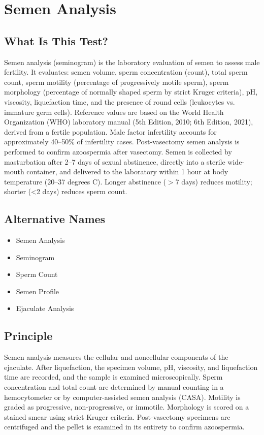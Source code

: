 \chapter{Semen Analysis}
\section*{What Is This Test?}
Semen analysis (seminogram) is the laboratory evaluation of semen to assess male fertility. It evaluates: semen volume, sperm concentration (count), total sperm count, sperm motility (percentage of progressively motile sperm), sperm morphology (percentage of normally shaped sperm by strict Kruger criteria), pH, viscosity, liquefaction time, and the presence of round cells (leukocytes vs. immature germ cells). Reference values are based on the World Health Organization (WHO) laboratory manual (5th Edition, 2010; 6th Edition, 2021), derived from a fertile population. Male factor infertility accounts for approximately 40--50\% of infertility cases. Post-vasectomy semen analysis is performed to confirm azoospermia after vasectomy. Semen is collected by masturbation after 2--7 days of sexual abstinence, directly into a sterile wide-mouth container, and delivered to the laboratory within 1 hour at body temperature (20--37 degrees C). Longer abstinence ($>$7 days) reduces motility; shorter (<2 days) reduces sperm count.
\section*{Alternative Names}
\begin{itemize}
  \item Semen Analysis
  \item Seminogram
  \item Sperm Count
  \item Semen Profile
  \item Ejaculate Analysis
\end{itemize}
\section*{Principle}
Semen analysis measures the cellular and noncellular components of the ejaculate. After liquefaction, the specimen volume, pH, viscosity, and liquefaction time are recorded, and the sample is examined microscopically. Sperm concentration and total count are determined by manual counting in a hemocytometer or by computer-assisted semen analysis (CASA). Motility is graded as progressive, non-progressive, or immotile. Morphology is scored on a stained smear using strict Kruger criteria. Post-vasectomy specimens are centrifuged and the pellet is examined in its entirety to confirm azoospermia.
